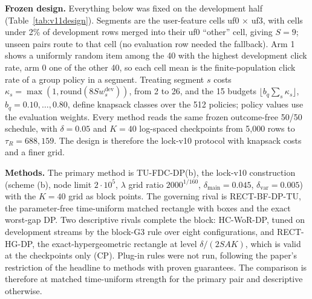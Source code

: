 \documentclass[sigconf,anonymous,review]{acmart}
\newcommand{\dmain}{\delta_{\text{main}}}
\newcommand{\dvar}{\delta_{\text{var}}}
\begin{document}
\textbf{Frozen design.} Everything below was fixed on the development half (Table~\ref{tab:v11design}). Segments are the user-feature cells uf0 $\times$ uf3, with cells under 2\% of development rows merged into their uf0 ``other'' cell, giving $S = 9$; unseen pairs route to that cell (no evaluation row needed the fallback). Arm 1 shows a uniformly random item among the 40 with the highest development click rate, arm 0 one of the other 40, so each cell mean is the finite-population click rate of a group policy in a segment. Treating segment $s$ costs $\kappa_s = \max(1, \mathrm{round}(8 S w_s^{\text{dev}}))$, from 2 to 26, and the 15 budgets $\lfloor b_q \sum_s \kappa_s \rfloor$, $b_q = 0.10, \dots, 0.80$, define knapsack classes over the 512 policies; policy values use the evaluation weights. Every method reads the same frozen outcome-free 50/50 schedule, with $\delta = 0.05$ and $K = 40$ log-spaced checkpoints from 5,000 rows to $\tau_R = 688{,}159$. The design is therefore the lock-v10 protocol with knapsack costs and a finer grid.



\textbf{Methods.} The primary method is TU-FDC-DP(b), the lock-v10 construction (scheme (b), node limit $2\cdot 10^5$, $\lambda$ grid ratio $2000^{1/160}$, $\dmain = 0.045$, $\dvar = 0.005$) with the $K = 40$ grid as block points. The governing rival is RECT-BF-DP-TU, the parameter-free time-uniform matched rectangle with boxes and the exact worst-gap DP. Two descriptive rivals complete the block: HC-WoR-DP, tuned on development streams by the block-G3 rule over eight configurations, and RECT-HG-DP, the exact-hypergeometric rectangle at level $\delta/(2SAK)$, which is valid at the checkpoints only (CP). Plug-in rules were not run, following the paper's restriction of the headline to methods with proven guarantees. The comparison is therefore at matched time-uniform strength for the primary pair and descriptive otherwise.
\end{document}
